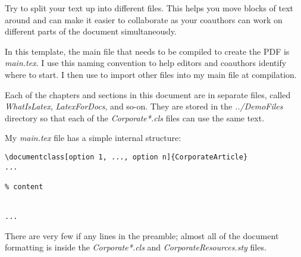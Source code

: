 Try to split your text up into different files. This helps you move blocks of text around and can make it easier to collaborate as your coauthors can work on different parts of the document simultaneously.

In this template, the main file that needs to be compiled to create the PDF is \emph{main.tex}. I use this naming convention to help editors and coauthors identify where to start. I then use \verb++ to import other files into my main file at compilation.

Each of the chapters and sections in this document are in separate files, called \emph{WhatIsLatex}, \emph{LatexForDocs}, and so-on. They are stored in the \emph{../DemoFiles} directory so that each of the \emph{Corporate*.cls} files can use the same text.

My \emph{main.tex} file has a simple internal structure:

\begin{lstlisting}[language={[LaTeX]Tex}]
\documentclass[option 1, ..., option n]{CorporateArticle}
...

% content


...
\end{lstlisting}

There are very few if any lines in the preamble; almost all of the document formatting is inside the \emph{Corporate*.cls} and \emph{CorporateResources.sty} files.